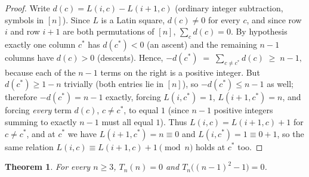 \documentclass[11pt]{amsart}
\newtheorem{theorem}{Theorem}[section]
\begin{document}
\begin{proof}
Write $d(c)=L(i,c)-L(i+1,c)$ (ordinary integer subtraction, symbols in $[n]$). Since $L$ is a Latin square, $d(c)\ne 0$ for every $c$, and since row $i$ and row $i+1$ are both permutations of $[n]$, $\sum_c d(c)=0$. By hypothesis exactly one column $c^\ast$ has $d(c^\ast)<0$ (an ascent) and the remaining $n-1$ columns have $d(c)>0$ (descents). Hence, $-d(c^\ast)\;=\;\sum_{c\ne c^\ast} d(c)\;\ge\; n-1,$
because each of the $n-1$ terms on the right is a positive integer. But $d(c^\ast)\ge 1-n$ trivially (both entries lie in $[n]$), so $-d(c^\ast)\le n-1$ as well; therefore $-d(c^\ast)=n-1$ exactly, forcing $L(i,c^\ast)=1$, $L(i+1,c^\ast)=n$, and forcing \emph{every} term $d(c)$, $c\ne c^\ast$, to equal $1$ (since $n-1$ positive integers summing to exactly $n-1$ must all equal $1$). Thus $L(i,c)=L(i+1,c)+1$ for $c\ne c^\ast$, and at $c^\ast$ we have $L(i+1,c^\ast)=n\equiv 0$ and $L(i,c^\ast)=1\equiv 0+1$, so the same relation $L(i,c)\equiv L(i+1,c)+1 \pmod n$ holds at $c^\ast$ too.
\end{proof}

\begin{theorem}\label{thm:isolation}
For every $n\ge 3$, $T_n(n)=0$ and $T_n\bigl((n-1)^2-1\bigr)=0$.
\end{theorem}
\end{document}
